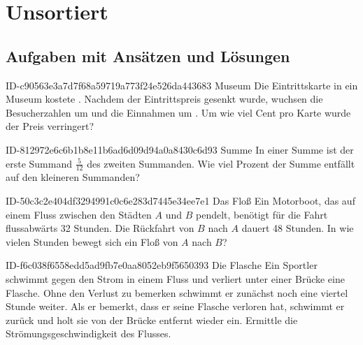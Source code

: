 \setcounter{chapter}{-1}
\chapter{Unsortiert}

\section{Aufgaben mit Ansätzen und Lösungen}

\begin{exercise}
      {ID-c90563e3a7d7f68a59719a773f24e526da443683}
      {Museum}
  \ifproblem\problem
    Die Eintrittskarte in ein Museum kostete . Nachdem der Eintrittspreis
    gesenkt wurde, wuchsen die Besucherzahlen um  und die Einnahmen um .
    Um wie viel Cent pro Karte wurde der Preis verringert?
  \fi
\end{exercise}

\begin{exercise}
      {ID-812972e6c6b1b8e11b6ad6d09d94a0a8430c6d93}
      {Summe}
  \ifproblem\problem
    In einer Summe ist der erste Summand $\frac{5}{12}$ des zweiten Summanden.
    Wie viel Prozent der Summe entfällt auf den kleineren Summanden?
  \fi
\end{exercise}

\begin{exercise}
      {ID-50c3c2e404df3294991c0c6e283d7445e34ee7e1}
      {Das Floß}
  \ifproblem\problem
    Ein Motorboot, das auf einem Fluss zwischen den Städten $A$ und $B$ pendelt,
    benötigt für die Fahrt flussabwärts 32 Stunden. Die Rückfahrt von $B$ nach
    $A$ dauert 48 Stunden. In wie vielen Stunden bewegt sich ein Floß von $A$
    nach $B$?
  \fi
\end{exercise}

\begin{exercise}
      {ID-f6c038f6558edd5ad9fb7e0aa8052eb9f5650393}
      {Die Flasche}
  \ifproblem\problem
    Ein Sportler schwimmt gegen den Strom in einem Fluss und verliert unter
    einer Brücke eine Flasche. Ohne den Verlust zu bemerken schwimmt er
    zunächst noch eine viertel Stunde weiter. Als er bemerkt, dass er seine
    Flasche verloren hat, schwimmt er zurück und holt sie  von der
    Brücke entfernt wieder ein. Ermittle die Strömungsgeschwindigkeit des
    Flusses.
  \fi
\end{exercise}

